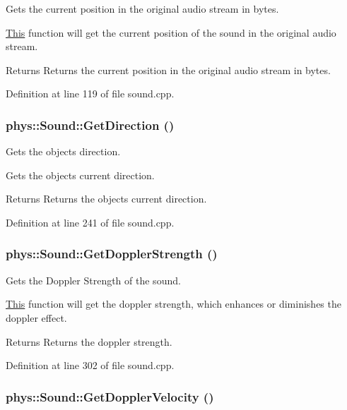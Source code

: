 Gets the current position in the original audio stream in bytes. 

\hyperlink{structThis}{This} function will get the current position of the sound in the original audio stream. \begin{DoxyReturn}{Returns}
Returns the current position in the original audio stream in bytes. 
\end{DoxyReturn}


Definition at line 119 of file sound.cpp.

\hypertarget{classphys_1_1Sound_a228e07cbcf0c8fee7b0f1f86a0162484}{
\subsubsection[{GetDirection}]{ phys::Sound::GetDirection ()}}
\label{dc/d2f/classphys_1_1Sound_a228e07cbcf0c8fee7b0f1f86a0162484}


Gets the objects direction. 

Gets the objects current direction. \begin{DoxyReturn}{Returns}
Returns the objects current direction. 
\end{DoxyReturn}


Definition at line 241 of file sound.cpp.

\hypertarget{classphys_1_1Sound_a894e1390d76c6a6e79404569afeaf168}{
\subsubsection[{GetDopplerStrength}]{ phys::Sound::GetDopplerStrength ()}}
\label{dc/d2f/classphys_1_1Sound_a894e1390d76c6a6e79404569afeaf168}


Gets the Doppler Strength of the sound. 

\hyperlink{structThis}{This} function will get the doppler strength, which enhances or diminishes the doppler effect. \begin{DoxyReturn}{Returns}
Returns the doppler strength. 
\end{DoxyReturn}


Definition at line 302 of file sound.cpp.

\hypertarget{classphys_1_1Sound_a9d4e845004b59ba5bdc066f7f12ff7d7}{
\subsubsection[{GetDopplerVelocity}]{ phys::Sound::GetDopplerVelocity ()}}
\label{dc/d2f/classphys_1_1Sound_a9d4e845004b59ba5bdc066f7f12ff7d7}


